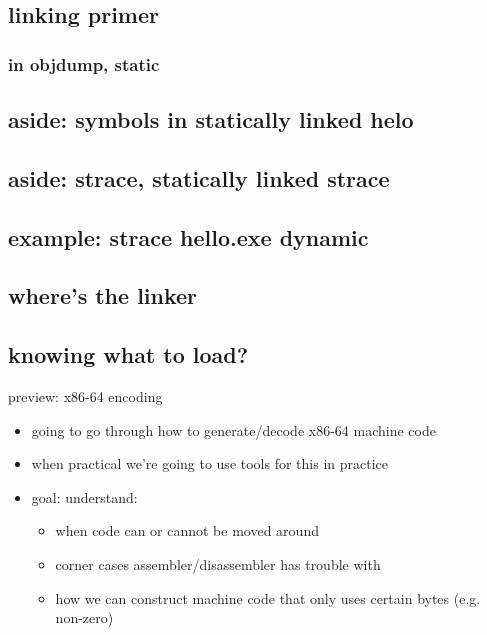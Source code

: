 \subsection{linking primer}


\subsubsection{in objdump, static}


\subsection{aside: symbols in statically linked helo}


\subsection{aside: strace, statically linked strace}


\subsection{example: strace hello.exe dynamic}


\subsection{where's the linker}



\subsection{knowing what to load?}





\begin{frame}{preview: x86-64 encoding}
    \begin{itemize}
    \item going to go through how to generate/decode x86-64 machine code
    \vspace{.5cm}
    \item when practical we're going to use tools for this in practice
    \item goal: understand:
        \begin{itemize}
        \item when code can or cannot be moved around
        \item corner cases assembler/disassembler has trouble with
        \item how we can construct machine code that only uses certain bytes (e.g. non-zero)
        \end{itemize}
    \end{itemize}
\end{frame}

